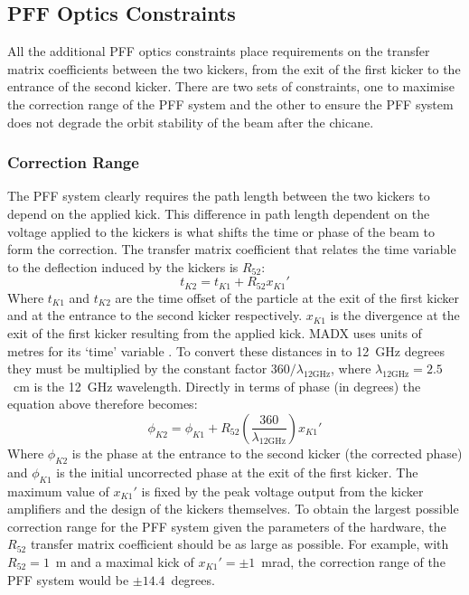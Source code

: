 \subsection{PFF Optics Constraints}
\label{ss:pffOpticsReqs}

All the additional PFF optics constraints place requirements on the transfer matrix coefficients between the two kickers, from the exit of the first kicker to the entrance of the second kicker. There are two sets of constraints, one to maximise the correction range of the PFF system and the other to ensure the PFF system does not degrade the orbit stability of the beam after the chicane.

\subsubsection{Correction Range}

The PFF system clearly requires the path length between the two kickers to depend on the applied kick. This difference in path length dependent on the voltage applied to the kickers is what shifts the time or phase of the beam to form the correction. The transfer matrix coefficient that relates the time variable to the deflection induced by the kickers is \(R_{52}\):
\begin{equation}
t_{K2} = t_{K1} + R_{52}x_{K1}'
\end{equation}
Where \(t_{K1}\) and \(t_{K2}\) are the time offset of the particle at the exit of the first kicker and at the entrance to the second kicker respectively. \(x_{K1}\) is the divergence at the exit of the first kicker resulting from the applied kick. MADX uses units of metres for its `time' variable \cite{madx}. To convert these distances in to 12~GHz degrees they must be multiplied by the constant factor \(360/\lambda_{\mathrm{12GHz}}\), where \(\lambda_{\mathrm{12GHz}} = 2.5\)~cm is the 12~GHz wavelength. Directly in terms of phase (in degrees) the equation above therefore becomes:
\begin{equation}
\phi_{K2} = \phi_{K1} + R_{52}\left(\frac{360}{\lambda_{\mathrm{12GHz}}}\right)x_{K1}'
\end{equation}
Where \(\phi_{K2}\) is the phase at the entrance to the second kicker (the corrected phase) and \(\phi_{K1}\) is the initial uncorrected phase at the exit of the first kicker. The maximum value of \(x_{K1}'\) is fixed by the peak voltage output from the kicker amplifiers and the design of the kickers themselves. To obtain the largest possible correction range for the PFF system given the parameters of the hardware, the \(R_{52}\) transfer matrix coefficient should be as large as possible. For example, with \(R_{52} = 1\)~m and a maximal kick of \(x_{K1}' = \pm 1\)~mrad, the correction range of the PFF system would be \(\pm 14.4\)~degrees.

